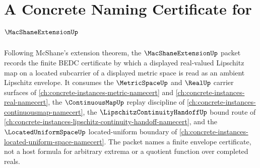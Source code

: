 \chapter{A Concrete Naming Certificate for $\MacShaneExtensionUp$}
\label{ch:concrete-instances-macshane-extension-namecert}

Following McShane's extension theorem, the $\MacShaneExtensionUp$ packet records the finite BEDC certificate by which a displayed real-valued Lipschitz map on a located subcarrier of a displayed metric space is read as an ambient Lipschitz envelope. It consumes the $\MetricSpaceUp$ and $\RealUp$ carrier surfaces of \autoref{ch:concrete-instances-metric-namecert} and \autoref{ch:concrete-instances-real-namecert}, the $\ContinuousMapUp$ replay discipline of \autoref{ch:concrete-instances-continuousmap-namecert}, the $\LipschitzContinuityHandoffUp$ bound route of \autoref{ch:concrete-instances-lipschitz-continuity-handoff-namecert}, and the $\LocatedUniformSpaceUp$ located-uniform boundary of \autoref{ch:concrete-instances-located-uniform-space-namecert}. The packet names a finite envelope certificate, not a host formula for arbitrary extrema or a quotient function over completed reals.

